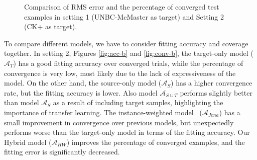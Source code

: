 \documentclass{article}
\begin{document}
\begin{figure*}[htbp]
\vspace{-.3cm}
\centering
{}
\vspace{-.2cm}
\hspace{.5cm}
\vspace{-.25cm}
\hspace{.5cm}
\caption{\small Comparison of RMS error and the percentage of converged test examples in setting 1 (UNBC-McMaster as target) and Setting 2 (CK+ as target).}
\label{Fig:curves}
\end{figure*}
To compare different models, we have to consider fitting accuracy and coverage together. In setting 2, 
Figures \ref{fig:acc-b} and \ref{fig:conv-b}, the target-only model ($\mathcal{A}_{T}$) has a good fitting accuracy over converged trials, while the percentage of convergence is very low, most likely due to the lack of expressiveness of the model. On the other hand, the source-only model ($\mathcal{A}_{S}$) has a higher convergence rate, but the fitting accuracy is lower. Also model $\mathcal{A}_{S\cup T}$ performs slightly better than model $\mathcal{A}_{S}$ as a result of including target samples, highlighting the importance of transfer learning. The instance-weighted model~\cite{haase2014instance} ($\mathcal{A}_{Jena}$) has a small improvement in convergence over previous models, but unexpectedly performs worse than the target-only model in terms of the fitting accuracy. Our Hybrid model ($\mathcal{A}_{HW}$) improves the percentage of converged examples, and the fitting error is significantly decreased. 
\vspace{-.1cm}
\end{document}
